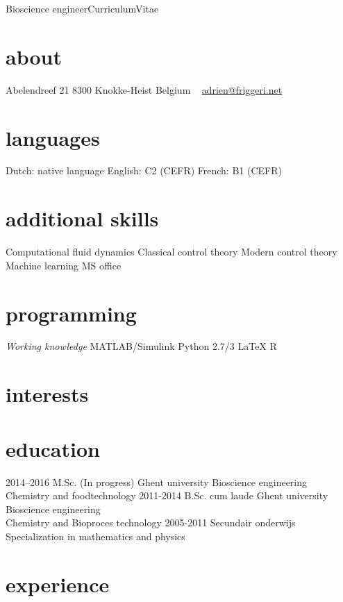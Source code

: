 \documentclass[]{friggeri-cv}
\begin{document}
       {Bioscience engineer}{Curriculum}{Vitae}
\begin{aside}
  \section{about}
    Abelendreef 21
    8300 Knokke-Heist
    Belgium
    ~
    \href{mailto:bram.de.jaegher@gmail.com}{adrien@friggeri.net}
  \section{languages}
    Dutch: native language
    English: C2 (CEFR)
    French:  B1  (CEFR)
  \section{additional skills}
  Computational fluid dynamics
  Classical control theory 
  Modern control theory 
  Machine learning
  MS office
  \section{programming}
  \textit{Working knowledge}
  MATLAB/Simulink
  Python 2.7/3
  LaTeX
  R 
\end{aside}
\section{interests}
\section{education}
\begin{entrylist}
    \entry
    {2014–2016}
    {M.Sc. (In progress)}
    {Ghent university}
    {Bioscience engineering\\
    Chemistry and foodtechnology}
  \entry
    {2011-2014}
    {B.Sc. cum laude}
    {Ghent university}
    {Bioscience engineering\\
    Chemistry and Bioproces technology}
  \entry
    {2005-2011}
    {Secundair onderwijs}
    {}
    {Specialization in mathematics and physics}
   
\end{entrylist}

\section{experience}
\end{document}
